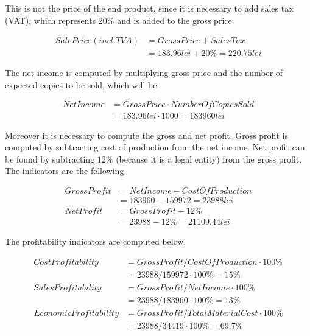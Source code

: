 \documentclass[12pt,a4paper]{report}
\begin{document}
This is not the price of the end product, since it is necessary to add sales tax (VAT), which represents $20\%$ and is added to the gross price. 

\begin{equation}
 \begin{split}
  Sale Price (incl. TVA) &= Gross Price + Sales Tax\\
              &= 183.96 lei + 20\% = 220.75 lei
 \end{split}
\end{equation}

The net income is computed by multiplying gross price and the number of expected copies to be sold, which will be

\begin{equation}
 \begin{split}
  Net Income &= Gross Price \cdot Number Of Copies Sold\\
              &= 183.96 lei \cdot 1000 = 183960 lei
 \end{split}
\end{equation}

Moreover it is necessary to compute the gross and net profit. Gross profit is computed by subtracting cost of production from the net income. Net profit can be found by subtracting $12\%$ (because it is a legal entity) from the gross profit. The indicators are the following

\begin{equation}
 \begin{split}
  Gross Profit &= Net Income - Cost Of Production\\
              &= 183960 - 159972 = 23988 lei\\              
  Net Profit &= Gross Profit - 12\% \\
             &= 23988 - 12\% = 21109.44 lei
 \end{split}
\end{equation}

The profitability indicators are computed below:

\begin{equation}
 \begin{split}
  Cost Profitability &= Gross Profit / Cost Of Production \cdot 100\%\\
              &= 23988 / 159972 \cdot 100\% = 15 \%\\              
  SalesProfitability &= Gross Profit / Net Income \cdot 100\% \\
             &= 23988 / 183960 \cdot 100\% = 13 \%\\
  EconomicProfitability &= Gross Profit / Total Material Cost \cdot 100\%\\
                        &= 23988 / 34419 \cdot 100\% = 69.7 \%\\
 \end{split}
\end{equation}
\end{document}
